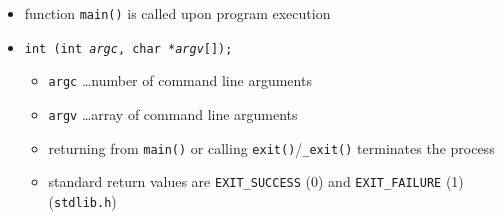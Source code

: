 

\begin{slide}
\renewcommand{\baselinestretch}{0.4}
\begin{itemize}
\setlength{\itemsep}{-0.5ex}
\setlength{\topsep}{1\itemsep}
\item function \texttt{main()} is called upon program execution
\item \texttt{int  (int \emph{argc}, char *\emph{argv}[]);}
    \begin{itemize}
    \item \texttt{argc} \dots number of command line arguments
    \item \texttt{argv} \dots array of command line arguments
    \item returning from \texttt{main()} or calling \texttt{exit()}/\texttt{\_exit()} terminates the process
    \item standard return values are \verb#EXIT_SUCCESS# (0) and
    \verb#EXIT_FAILURE# (1) (\texttt{stdlib.h})
    \end{itemize}
\end{itemize}

\begin{center}

\end{center}
\end{slide}

